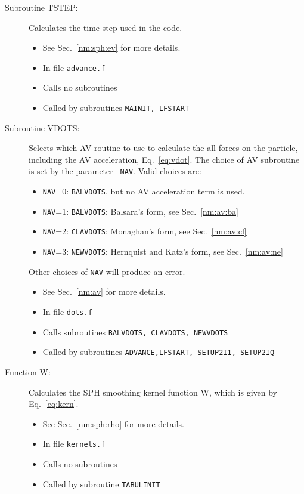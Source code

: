 \begin{description}
\item[Subroutine TSTEP:] Calculates the time step used in the code.
\begin{itemize} 
\item See Sec.~\ref{nm:sph:ev} for more details.
\item In file {\tt advance.f}
\item Calls no subroutines
\item Called by subroutines {\tt MAINIT, LFSTART}
\end{itemize}

\item[Subroutine VDOTS:] Selects which AV routine to use to calculate
the all forces on the particle, including the AV acceleration, 
Eq.~\ref{eq:vdot}.  The choice of AV subroutine is set by the parameter {\tt
NAV}.  Valid choices are:
\begin{itemize}
\item {\tt NAV}=0: {\tt BALVDOTS}, but no AV acceleration term is used.
\item {\tt NAV}=1: {\tt BALVDOTS}: Balsara's form, see Sec.~\ref{nm:av:ba}
\item {\tt NAV}=2: {\tt CLAVDOTS}: Monaghan's form, see Sec.~\ref{nm:av:cl}
\item {\tt NAV}=3: {\tt NEWVDOTS}: Hernquist and Katz's form, see
Sec.~\ref{nm:av:ne} 
\end{itemize}
Other choices of {\tt NAV} will produce an error.
\begin{itemize} 
\item See Sec.~\ref{nm:av} for more details.
\item In file {\tt dots.f}
\item Calls subroutines {\tt BALVDOTS, CLAVDOTS, NEWVDOTS}
\item Called by subroutines {\tt ADVANCE,LFSTART, SETUP2I1, SETUP2IQ}
\end{itemize}

\item[Function W:] Calculates the SPH smoothing
kernel function W, which is given by Eq.~\ref{eq:kern}.
\begin{itemize} 
\item See Sec.~\ref{nm:sph:rho} for more details.
\item In file {\tt kernels.f}
\item Calls no subroutines
\item Called by subroutine {\tt TABULINIT}
\end{itemize} 
\end{description}

